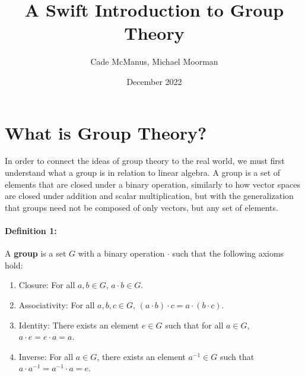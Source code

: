 \documentclass{article}
\title{\textbf{A Swift Introduction to Group Theory}}
\author{Cade McManus, Michael Moorman}
\date{December 2022}
\begin{document}
\maketitle

\section{What is Group Theory?}

In order to connect the ideas of group theory to the real world, we must first understand what a group is 
in relation to linear algebra. A group is a set of elements that are closed under a binary operation,
similarly to how vector spaces are closed under addition and scalar multiplication, but with the 
generalization that groups need not be composed of only vectors, but any set of elements.

\paragraph*{Definition 1:} A \textbf{group} is a set $G$ with a binary operation $\cdot$ 
such that the following axioms hold:
\begin{enumerate}
    \item Closure: For all $a,b \in G$, $a \cdot b \in G$.
    \item Associativity: For all $a,b,c \in G$, $(a \cdot b) \cdot c = a \cdot (b \cdot c)$.
    \item Identity: There exists an element $e \in G$ such that for all $a \in G$, $a \cdot e = e \cdot a = a$.
    \item Inverse: For all $a \in G$, there exists an element $a^{-1} \in G$ such that $a \cdot a^{-1} = a^{-1} \cdot a = e$.
\end{enumerate}
\end{document}
